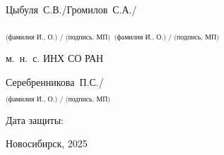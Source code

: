 \begin{titlepage}
\begin{spacing}{1.15}
\noindent
Цыбуля~С.В./\writesign{}\hfill{}Громилов~С.А./\writesign{}

\noindent
$_\text{(фамилия И., О.) / (подпись, МП)}$ \hfill $_\text{(фамилия И., О.) / (подпись, МП)}$
\vspace{10pt}

\noindent
\writedate\hfill м.~н.~с. ИНХ СО РАН
\vspace{10pt}

\noindent
\hfill Серебренникова~П.С./\writesign{}

\noindent
\hfill $_\text{(фамилия И., О.) / (подпись, МП)}$
\vspace{10pt}

\noindent
\hfill\writedate{}
\vspace{8mm}

\hfill Дата защиты:\writedate{}
\vspace{8mm}

\begin{center}
    Новосибирск, 2025
\end{center}

\end{spacing}
\end{titlepage}